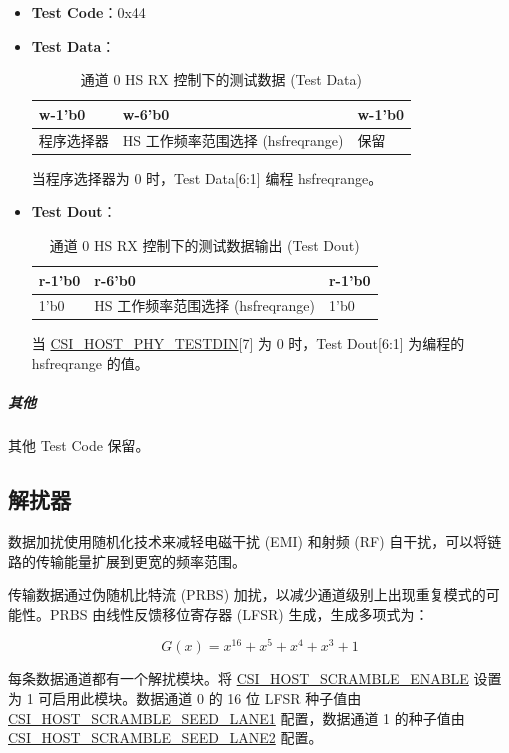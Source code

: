 \documentclass[main\_\_CN.tex]{subfiles}
\begin{document}
\begin{itemize}
    \item \textbf{Test Code}：0x44
    \item \textbf{Test Data}：
        \begin{longtable}{ | p{4cm} | p{8cm} | p{2cm} |}
        \caption{通道 0 HS RX 控制下的测试数据 (Test Data)}
        \label{tab:mipicsi-hsfreqrange} \\
        \hline
        \rowcolor{lightgray}
        \textbf{w-1'b0} & \textbf{w-6'b0} & \textbf{w-1'b0} \\ \hline
        程序选择器 & HS 工作频率范围选择 (hsfreqrange) & 保留  \\ \hline
        \end{longtable}
        当程序选择器为 0 时，Test Data[6:1] 编程 hsfreqrange。
    \item \textbf{Test Dout}：
        \begin{longtable}{ | p{4cm} | p{8cm} | p{2cm} |}
        \caption{通道 0 HS RX 控制下的测试数据输出 (Test Dout)}
        \label{tab:mipicsi-hsfreqrange-dout} \\
        \hline
        \rowcolor{lightgray}
        \textbf{r-1'b0} & \textbf{r-6'b0} & \textbf{r-1'b0} \\ \hline
        1'b0 & HS 工作频率范围选择 (hsfreqrange) & 1'b0  \\ \hline
        \end{longtable}
        当 \hyperref[fielddesc:CSIHOSTPHYTESTDIN]{CSI\_HOST\_PHY\_TESTDIN}[7] 为 0 时，Test Dout[6:1] 为编程的 hsfreqrange 的值。
\end{itemize}

\subparagraph{其他}
其他 Test Code 保留。

\subsection{解扰器}

数据加扰使用随机化技术来减轻电磁干扰 (EMI) 和射频 (RF) 自干扰，可以将链路的传输能量扩展到更宽的频率范围。

传输数据通过伪随机比特流 (PRBS) 加扰，以减少通道级别上出现重复模式的可能性。PRBS 由线性反馈移位寄存器 (LFSR) 生成，生成多项式为：

\begin{equation}
    G(x) = x^{16} + x^5 + x^4 + x^3 + 1
\end{equation}

每条数据通道都有一个解扰模块。将 \hyperref[fielddesc:CSIHOSTSCRAMBLEENABLE]{CSI\_HOST\_SCRAMBLE\_ENABLE} 设置为 1 可启用此模块。数据通道 0 的 16 位 LFSR 种子值由 \hyperref[fielddesc:CSIHOSTSCRAMBLESEEDLANE1]{CSI\_HOST\_SCRAMBLE\_SEED\_LANE1} 配置，数据通道 1 的种子值由 \hyperref[fielddesc:CSIHOSTSCRAMBLESEEDLANE2]{CSI\_HOST\_SCRAMBLE\_SEED\_LANE2} 配置。
\end{document}
